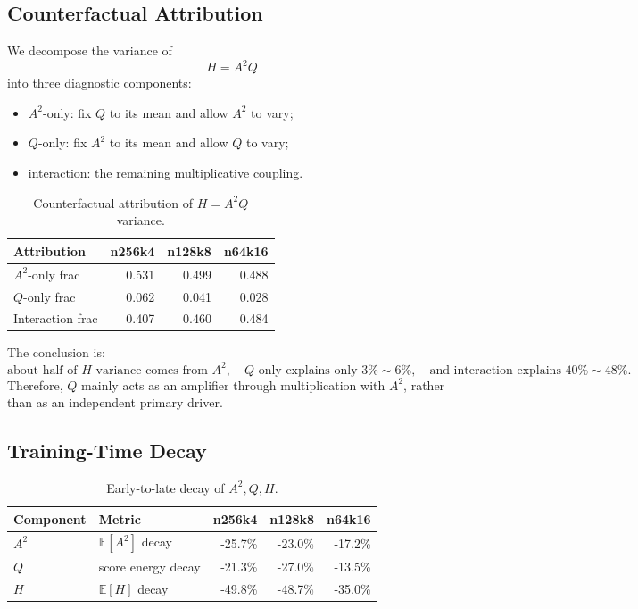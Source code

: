 \documentclass[11pt,a4paper]{article}
\newcommand{\E}{\mathbb{E}}
\begin{document}
\subsection{Counterfactual Attribution}

We decompose the variance of
\[
H=A^2Q
\]
into three diagnostic components:
\begin{itemize}[leftmargin=2em]
    \item \(A^2\)-only: fix \(Q\) to its mean and allow \(A^2\) to vary;
    \item \(Q\)-only: fix \(A^2\) to its mean and allow \(Q\) to vary;
    \item interaction: the remaining multiplicative coupling.
\end{itemize}

\begin{table}[h]
\centering
\begin{tabular}{lrrr}
\toprule
Attribution & n256k4 & n128k8 & n64k16\\
\midrule
\(A^2\)-only frac & 0.531 & 0.499 & 0.488\\
\(Q\)-only frac & 0.062 & 0.041 & 0.028\\
Interaction frac & 0.407 & 0.460 & 0.484\\
\bottomrule
\end{tabular}
\caption{Counterfactual attribution of \(H=A^2Q\) variance.}
\end{table}

The conclusion is:
\[
\boxed{
\text{about half of }H\text{ variance comes from } A^2,\quad
Q\text{-only explains only }3\%\sim6\%,\quad
\text{and interaction explains }40\%\sim48\%.
}
\]
Therefore, \(Q\) mainly acts as an amplifier through multiplication with \(A^2\), rather than as an independent primary driver.

\subsection{Training-Time Decay}

\begin{table}[h]
\centering
\begin{tabular}{llrrr}
\toprule
Component & Metric & n256k4 & n128k8 & n64k16\\
\midrule
\(A^2\) & \(\E[A^2]\) decay & -25.7\% & -23.0\% & -17.2\%\\
\(Q\) & score energy decay & -21.3\% & -27.0\% & -13.5\%\\
\(H\) & \(\E[H]\) decay & -49.8\% & -48.7\% & -35.0\%\\
\bottomrule
\end{tabular}
\caption{Early-to-late decay of \(A^2,Q,H\).}
\end{table}
\end{document}
